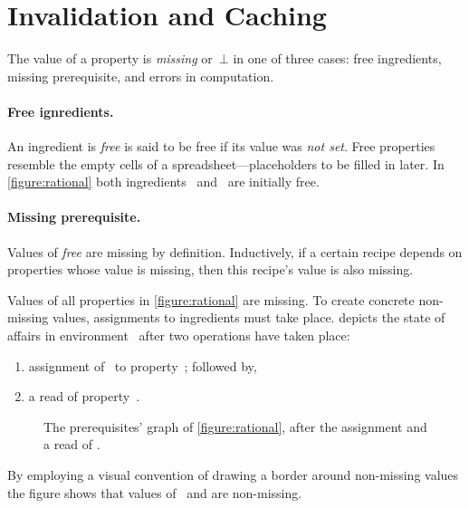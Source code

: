 \section{Invalidation and Caching}
The value of a property is \emph{missing} or~$⊥$ in one of three cases: free
ingredients, missing prerequisite, and errors in computation.

\paragraph{Free ignredients.}
An ingredient is \emph{free} is said to be free if its value was \emph{not
set}. Free properties resemble the empty cells of a spreadsheet---placeholders
to be filled in later. In \cref{figure:rational} both ingredients~
and~ are initially free.

\paragraph{Missing prerequisite.}
Values of \emph{free} are missing by definition. Inductively, if a certain
recipe depends on properties whose value is missing, then this recipe's value
is also missing.

Values of all properties in \cref{figure:rational} are missing. To create
concrete non-missing values, assignments to ingredients must take place.
 depicts the state of affairs in
environment~ after two operations have taken place:

\begin{enumerate}
  \item assignment of~ to property~; followed by,
  \item a read of property~.
\end{enumerate}

  \begin{figure}[H]
    \caption{\label{figure:rational:1}%
      The prerequisites' graph of \cref{figure:rational},
      after the assignment  and a read of .
    }
    \begin{adjustbox}{max width=\columnwidth}
      
    \end{adjustbox}
  \end{figure}

By employing a visual convention of drawing a border around non-missing values
the figure shows that values of~ and  are non-missing.

